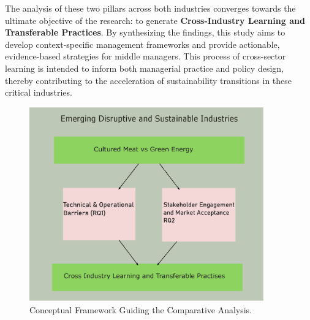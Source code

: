 The analysis of these two pillars across both industries converges towards the ultimate objective of the research: to generate \textbf{Cross-Industry Learning and Transferable Practices}. By synthesizing the findings, this study aims to develop context-specific management frameworks and provide actionable, evidence-based strategies for middle managers. This process of cross-sector learning is intended to inform both managerial practice and policy design, thereby contributing to the acceleration of sustainability transitions in these critical industries.

\begin{figure}[h!]
	\centering
	\includegraphics[width=0.9\textwidth]{images/conceptual_Model.eps}
	\caption{Conceptual Framework Guiding the Comparative Analysis.}
	\label{fig:framework}
\end{figure}
	
	
